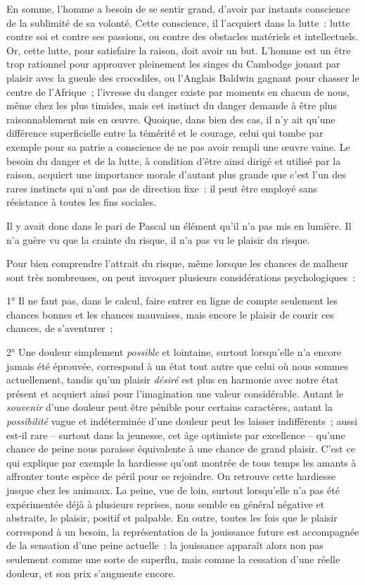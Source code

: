 \documentclass[french,twoside]{book} %
\begin{document}
En somme, l’homme a besoin de se sentir grand, d’avoir par instants conscience de la sublimité de sa volonté. Cette conscience, il l’acquiert dans la lutte : lutte contre soi et contre ses passions, ou contre des obstacles matériels et intellectuels. Or, cette lutte, pour satisfaire la raison, doit avoir un but. L’homme est un être trop rationnel pour approuver pleinement les singes du Cambodge jouant par plaisir avec la gueule des crocodiles, ou l’Anglais Baldwin gagnant pour chasser le centre de l’Afrique ; l’ivresse du danger existe par moments en chacun de nous, même chez les plus timides, mais cet instinct du danger demande à être plus raisonnablement mis en œuvre. Quoique, dans bien des cas, il n’y ait qu’une différence superficielle entre la témérité et le courage, celui qui tombe par exemple pour sa patrie a conscience de ne pas avoir rempli une œuvre vaine. Le besoin du danger et de la lutte, à condition d’être ainsi dirigé et utilisé par la raison, acquiert une importance morale d’autant plus grande que c’est l’un des rares instincts qui n’ont pas de direction fixe : il peut être employé sans résistance à toutes les fins sociales.\par
Il y avait donc dans le pari de Pascal un élément qu’il n’a pas mis en lumière. Il n’a guère vu que la crainte du risque, il n’a pas vu le plaisir du risque.\par
Pour bien comprendre l’attrait du risque, même lorsque les chances de malheur sont très nombreuses, on peut invoquer plusieurs considérations psychologiques :\par
1° Il ne faut pas, dans le calcul, faire entrer en ligne de compte seulement les chances bonnes et les chances mauvaises, mais encore le plaisir de courir ces chances, de s’aventurer ;\par
2° Une douleur simplement \emph{possible} et lointaine, surtout lorsqu’elle n’a encore jamais été éprouvée, correspond à un état tout autre que celui où nous sommes actuellement, tandis qu’un plaisir \emph{désiré} est plus en harmonie avec notre état présent et acquiert ainsi pour l’imagination une valeur considérable. Autant le \emph{souvenir} d’une douleur peut être pénible pour certains caractères, autant la \emph{possibilité} vague et indéterminée d’une douleur peut les laisser indifférents ; aussi est-il rare – surtout dans la jeunesse, cet âge optimiste par excellence – qu’une chance de peine nous paraisse équivalente à une chance de grand plaisir. C’est ce qui explique par exemple la hardiesse qu’ont montrée de tous temps les amants à affronter toute espèce de péril pour se rejoindre. On retrouve cette hardiesse jusque chez les animaux. La peine, vue de loin, surtout lorsqu’elle n’a pas été expérimentée déjà à plusieurs reprises, nous semble en général négative et abstraite, le plaisir, positif et palpable. En outre, toutes les fois que le plaisir correspond à un besoin, la représentation de la jouissance future est accompagnée de la sensation d’une peine actuelle : la jouissance apparaît alors non pas seulement comme une sorte de superflu, mais comme la cessation d’une réelle douleur, et son prix s’augmente encore.\par
\end{document}
